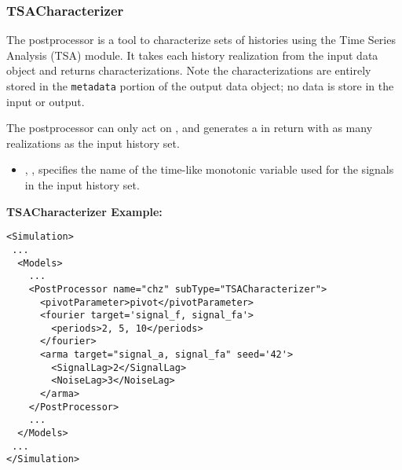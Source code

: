 





%

\subsubsection{TSACharacterizer}
\label{TSACharacterizer}
The  postprocessor is a tool to characterize sets of histories using
the Time Series Analysis (TSA) module. It takes each history realization from the input data object
and returns characterizations. Note the characterizations are entirely stored in the \texttt{metadata}
portion of the output data object; no data is store in the input or output.

The  postprocessor can only act on  ,
and generates a   in return with as many realizations as the input
history set.

%
\begin{itemize}
  \item {}, , specifies the name of the time-like
    monotonic variable used for the signals in the input history set.
\end{itemize}

\tsaList

\textbf{TSACharacterizer Example:}

\begin{lstlisting}[style=XML]
<Simulation>
 ...
  <Models>
    ...
    <PostProcessor name="chz" subType="TSACharacterizer">
      <pivotParameter>pivot</pivotParameter>
      <fourier target='signal_f, signal_fa'>
        <periods>2, 5, 10</periods>
      </fourier>
      <arma target="signal_a, signal_fa" seed='42'>
        <SignalLag>2</SignalLag>
        <NoiseLag>3</NoiseLag>
      </arma>
    </PostProcessor>
    ...
  </Models>
 ...
</Simulation>
\end{lstlisting}
